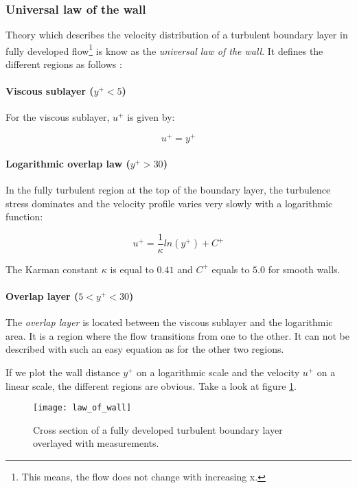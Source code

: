 \subsubsection{Universal law of the wall}
Theory which describes the velocity distribution of a turbulent boundary layer
in fully developed flow\footnote{This means, the flow does not change with
increasing x.}  is know as the \textit{universal law of the wall}. It defines the
different regions as follows \cite{Schlichting2018}:

\paragraph{Viscous sublayer ($y^{+} < 5$)}
For the viscous sublayer, $u^{+}$ is given by:

\begin{equation}
  u^{+} = y^{+}
\end{equation}

\paragraph{Logarithmic overlap law ($y^{+} > 30$)}
In the fully turbulent region at the top of the boundary layer, the turbulence
stress dominates and the velocity profile varies very slowly with a logarithmic
function:

\begin{equation}
  u^{+} = \frac{1}{\kappa} ln(y^{+}) + C^{+}
  \label{eq:overlap_law}
\end{equation}

\noindent The Karman constant $\kappa$ is equal to $0.41$ and $C^{+}$ equals to
$5.0$ for smooth walls.

\paragraph{Overlap layer ($5 < y^{+} < 30$)}
The \textit{overlap layer} is located between the viscous sublayer and the
logarithmic area. It is a region where the flow transitions from one to the
other. It can not be described with such an easy equation as for the other two
regions.

If we plot the wall distance $y^{+}$ on a logarithmic scale and the velocity
$u^{+}$ on a linear scale, the different regions are obvious. Take a look at
figure \ref{fig:law_of_wall}.

\begin{figure}[H] \centering
\texttt{[image: law\_of\_wall]}
    \caption{Cross section of a fully developed turbulent boundary layer
             overlayed with measurements\cite{Schlichting2018}.}
    \label{fig:law_of_wall}
\end{figure}





